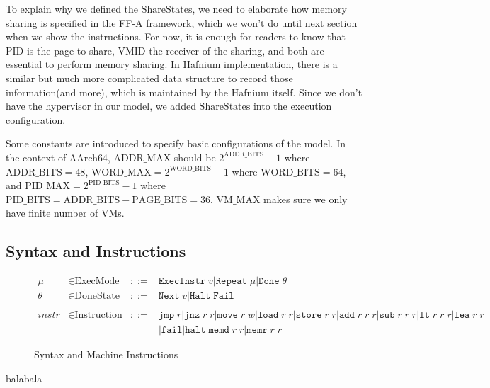 \documentclass[a4paper]{article}
\newcommand*{\derived}{::=}
\newcommand*{\SSS}{\text{ShareStates}}
\newcommand*{\PID}{\text{PID}}
\newcommand*{\VMID}{\text{VMID}}
\newcommand*{\MODE}{\text{ExecMode}}
\newcommand*{\DONE}{\text{DoneState}}
\newcommand*{\INSTR}{\text{Instruction}}
\newcommand*{\PABITS}{\text{ADDR\_BITS}}
\newcommand*{\PPBITS}{\text{PAGE\_BITS}}
\newcommand*{\PPIDBITS}{\text{PID\_BITS}}
\newcommand*{\PAMAX}{\text{ADDR\_MAX}}
\newcommand*{\PPIDMAX}{\text{PID\_MAX}}
\newcommand*{\PWBITS}{\text{WORD\_BITS}}
\newcommand*{\PWMAX}{\text{WORD\_MAX}}
\newcommand*{\PVMMAX}{\text{VM\_MAX}}
\newcommand*{\instrm}[1]{\mathtt{#1}}
\newcommand*{\NXT}[1]{\mathtt{Next} \; {#1}}
\begin{document}
To explain why we defined the $\SSS$, we need to elaborate how memory sharing is specified in the FF-A framework, which we won't do until next section when we show the instructions. For now, it is enough for readers to know that $\PID$ is the page to share, $\VMID$ the receiver of the sharing, and both are essential to perform memory sharing. In Hafnium implementation, there is a similar but much more complicated data structure to record those information(and more), which is maintained by the Hafnium itself. Since we don't have the hypervisor in our model, we added $\SSS$ into the execution configuration.

Some constants are introduced to specify basic configurations of the model. In the context of AArch64, $\PAMAX$ should be $2^{\PABITS} - 1$ where $\PABITS = 48$, $\PWMAX = 2^{\PWBITS} -1$ where $\PWBITS = 64$, and $\PPIDMAX = 2^{\PPIDBITS}-1$ where $\PPIDBITS = \PABITS - \PPBITS = 36$. $\PVMMAX$ makes sure we only have finite number of VMs.





\subsection{Syntax and Instructions}
\begin{figure}[h!]
\begin{align*}
  \mu &\in \MODE &\derived & \mathtt{ExecInstr} \; v | \mathtt{Repeat} \; \mu | \mathtt{Done} \; \theta \\
  \theta &\in \DONE &\derived & \NXT{v} | \mathtt{Halt} | \mathtt{Fail}\\
  \\
  instr & \in  \INSTR &\derived & \instrm{jmp} \; r | \instrm{jnz} \; r \; r | \instrm{move} \; r \; w | \instrm{load} \; r\; r | \instrm{store} \; r \; r | \instrm{add} \; r \; r \; r | \instrm{sub} \; r \; r \; r | \instrm{lt} \; r \; r \; r | \instrm{lea} \; r \; r \\
  & & & | \instrm{fail} | \instrm{halt} | \instrm{memd} \; r \; r | \instrm{memr} \; r\; r
\end{align*}
\caption{Syntax and Machine Instructions}
\end{figure}

balabala
\end{document}
